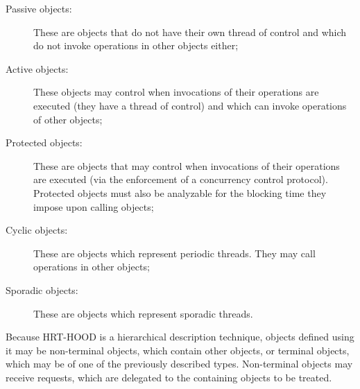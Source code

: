 \begin{description}
\item[Passive objects:]{These are objects that do not have their own
  thread of control and which do not invoke operations in other
  objects either;}
\item[Active objects:]{These objects may control when invocations of
  their operations are executed (they have a thread of control) and
  which can invoke operations of other objects;}
\item[Protected objects:]{These are objects that may control when
  invocations of their operations are executed (via the enforcement of
  a concurrency control protocol). Protected objects must also be
  analyzable for the blocking time they impose upon calling objects;}
\item[Cyclic objects:]{These are objects which represent periodic
  threads. They may call operations in other objects;}
\item[Sporadic objects:]{These are objects which represent sporadic
  threads.}
\end{description}

Because HRT-HOOD is a hierarchical description technique, objects
defined using it may be non-terminal objects, which contain other
objects, or terminal objects, which may be of one of the previously
described types. Non-terminal objects may receive requests, which are
delegated to the containing objects to be treated.

